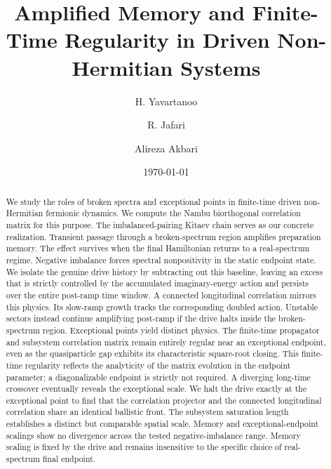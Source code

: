 \documentclass[aps,prb,reprint,superscriptaddress,amsmath,amssymb,floatfix]{revtex4-2}
\begin{document}
\title{Amplified Memory and Finite-Time Regularity in Driven Non-Hermitian Systems}

\author{H. Yavartanoo}

\author{R. Jafari}


\author{Alireza Akbari}

\date{\today}
\begin{abstract}
We study the roles of broken spectra and exceptional points in finite-time driven non-Hermitian fermionic dynamics. We compute the Nambu biorthogonal correlation matrix for this purpose. The imbalanced-pairing Kitaev chain serves as our concrete realization.
%
Transient passage through a broken-spectrum region amplifies preparation memory. The effect survives when the final Hamiltonian returns to a real-spectrum regime. Negative imbalance forces spectral nonpositivity in the static endpoint state. We isolate the genuine drive history by subtracting out this baseline, leaving an excess that is strictly controlled by the accumulated imaginary-energy action and persists over the entire post-ramp time window. A connected longitudinal correlation mirrors this physics. Its slow-ramp growth tracks the corresponding doubled action. Unstable sectors instead continue amplifying post-ramp if the drive halts inside the broken-spectrum region.
%
Exceptional points yield distinct physics. The finite-time propagator and subsystem correlation matrix remain entirely regular near an exceptional endpoint, even as the quasiparticle gap exhibits its characteristic square-root closing.
%
This finite-time regularity reflects the analyticity of the matrix evolution in the endpoint parameter; a diagonalizable endpoint is strictly not required.
%
A diverging long-time crossover eventually reveals the exceptional scale. We halt the drive exactly at the exceptional point to find that the correlation projector and the connected longitudinal correlation share an identical ballistic front. The subsystem saturation length establishes a distinct but comparable spatial scale. Memory and exceptional-endpoint scalings show no divergence across the tested negative-imbalance range. Memory scaling is fixed by the drive and remains insensitive to the specific choice of real-spectrum final endpoint.
\end{abstract}
\end{document}

